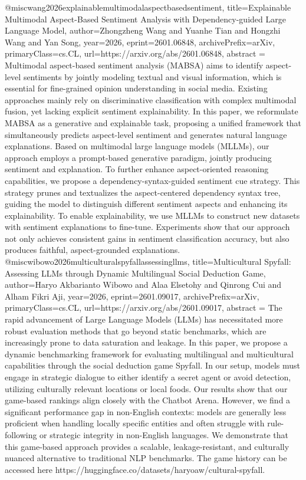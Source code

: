 {}@misc{wang2026explainablemultimodalaspectbasedsentiment,
      title={Explainable Multimodal Aspect-Based Sentiment Analysis with Dependency-guided Large Language Model}, 
      author={Zhongzheng Wang and Yuanhe Tian and Hongzhi Wang and Yan Song},
      year={2026},
      eprint={2601.06848},
      archivePrefix={arXiv},
      primaryClass={cs.CL},
      url={https://arxiv.org/abs/2601.06848},
      abstract = {Multimodal aspect-based sentiment analysis (MABSA) aims to identify aspect-level sentiments by jointly modeling textual and visual information, which is essential for fine-grained opinion understanding in social media. Existing approaches mainly rely on discriminative classification with complex multimodal fusion, yet lacking explicit sentiment explainability. In this paper, we reformulate MABSA as a generative and explainable task, proposing a unified framework that simultaneously predicts aspect-level sentiment and generates natural language explanations. Based on multimodal large language models (MLLMs), our approach employs a prompt-based generative paradigm, jointly producing sentiment and explanation. To further enhance aspect-oriented reasoning capabilities, we propose a dependency-syntax-guided sentiment cue strategy. This strategy prunes and textualizes the aspect-centered dependency syntax tree, guiding the model to distinguish different sentiment aspects and enhancing its explainability. To enable explainability, we use MLLMs to construct new datasets with sentiment explanations to fine-tune. Experiments show that our approach not only achieves consistent gains in sentiment classification accuracy, but also produces faithful, aspect-grounded explanations.}
}@misc{wibowo2026multiculturalspyfallassessingllms,
      title={Multicultural Spyfall: Assessing LLMs through Dynamic Multilingual Social Deduction Game}, 
      author={Haryo Akbarianto Wibowo and Alaa Elsetohy and Qinrong Cui and Alham Fikri Aji},
      year={2026},
      eprint={2601.09017},
      archivePrefix={arXiv},
      primaryClass={cs.CL},
      url={https://arxiv.org/abs/2601.09017},
      abstract = {The rapid advancement of Large Language Models (LLMs) has necessitated more robust evaluation methods that go beyond static benchmarks, which are increasingly prone to data saturation and leakage. In this paper, we propose a dynamic benchmarking framework for evaluating multilingual and multicultural capabilities through the social deduction game Spyfall. In our setup, models must engage in strategic dialogue to either identify a secret agent or avoid detection, utilizing culturally relevant locations or local foods. Our results show that our game-based rankings align closely with the Chatbot Arena. However, we find a significant performance gap in non-English contexts: models are generally less proficient when handling locally specific entities and often struggle with rule-following or strategic integrity in non-English languages. We demonstrate that this game-based approach provides a scalable, leakage-resistant, and culturally nuanced alternative to traditional NLP benchmarks. The game history can be accessed here https://huggingface.co/datasets/haryoaw/cultural-spyfall.}
}
